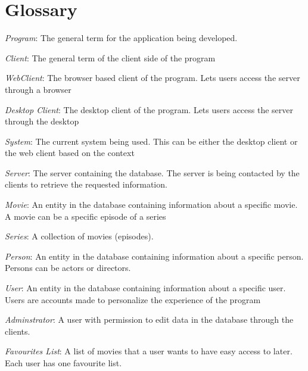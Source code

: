 \section{Glossary}
\label{sec:glossary}

\emph{Program}: The general term for the application being developed.

\emph{Client}: The general term of the client side of the program

\emph{WebClient}: The browser based client of the program. Lets users access the server through a browser

\emph{Desktop Client}: The desktop client of the program. Lets users access the server through the desktop

\emph{System}: The current system being used. This can be either the desktop client or the web client based on the context

\emph{Server}: The server containing the database. The server is being contacted by the clients to retrieve the requested information.

\emph{Movie}: An entity in the database containing information about a specific movie. A movie can be a specific episode of a series

\emph{Series}: A collection of movies (episodes).

\emph{Person}: An entity in the database containing information about a specific person. Persons can be actors or directors.

\emph{User}: An entity in the database containing information about a specific user. Users are accounts made to personalize the experience of the program

\emph{Adminstrator}: A user with permission to edit data in the database through the clients.

\emph{Favourites List}: A list of movies that a user wants to have easy access to later. Each user has one favourite list.